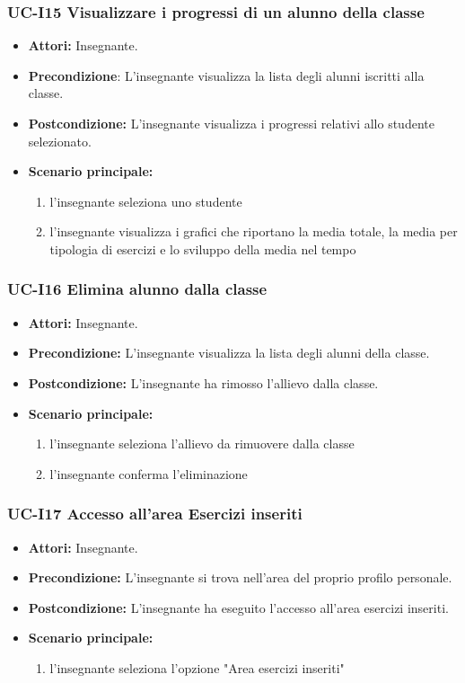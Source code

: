 \subsubsection{UC-I15 Visualizzare i progressi di un alunno della classe}
\begin{itemize}
	\item \textbf{Attori:} Insegnante.
	\item \textbf{Precondizione}: L'insegnante visualizza la lista degli alunni iscritti alla classe.
	\item \textbf{Postcondizione:} L'insegnante visualizza i progressi relativi allo studente selezionato.
	\item \textbf{Scenario principale:}
	\begin{enumerate}
		\item l'insegnante seleziona uno studente
		\item l'insegnante visualizza i grafici che riportano la media totale, la media per tipologia di esercizi e lo sviluppo della media nel tempo
	\end{enumerate}
\end{itemize}

\subsubsection{UC-I16 Elimina alunno dalla classe}		
\begin{itemize}
	\item \textbf{Attori:} Insegnante.
	\item \textbf{Precondizione:} L'insegnante visualizza la lista degli alunni della classe.
	\item \textbf{Postcondizione:} L'insegnante ha rimosso l'allievo dalla classe.
	\item \textbf{Scenario principale:}
	\begin{enumerate}
		\item l'insegnante seleziona l'allievo da rimuovere dalla classe
		\item l'insegnante conferma l'eliminazione
	\end{enumerate}	
\end{itemize}

\subsubsection{UC-I17 Accesso all'area Esercizi inseriti}		
\begin{itemize}
	\item \textbf{Attori:} Insegnante.
	\item \textbf{Precondizione:} L'insegnante si trova nell'area del proprio profilo personale.
	\item \textbf{Postcondizione:} L'insegnante ha eseguito l'accesso all'area esercizi inseriti.
	\item \textbf{Scenario principale:}
	\begin{enumerate}
		\item l'insegnante seleziona l'opzione "Area esercizi inseriti"
	\end{enumerate}	
\end{itemize}

